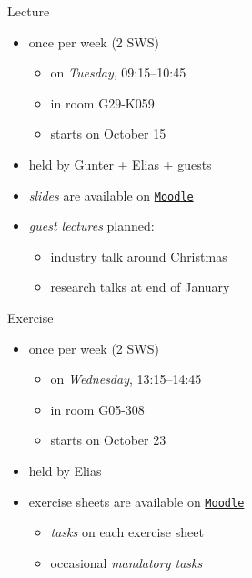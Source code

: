 \begin{frame}{\myframetitle}
	\begin{fancycolumns}
		\begin{definition}{Lecture}
			\begin{itemize}
				\item once per week (2 SWS)
				\begin{itemize}
					\item on \emph{Tuesday}, 09:15--10:45
					\item in room G29-K059
					\item starts on October 15
				\end{itemize}
				\item held by Gunter + Elias + guests
				\item \emph{slides} are available on \texttt{\href{https://elearning.ovgu.de/course/view.php?id=17250}{Moodle}}
				\item \emph{guest lectures} planned:
				\begin{itemize}
					\item industry talk around Christmas
					\item research talks at end of January
				\end{itemize}
			\end{itemize}
		\end{definition}
	\nextcolumn
		\begin{example}{Exercise}
			\begin{itemize}
				\item once per week (2 SWS)
				\begin{itemize}
					\item on \emph{Wednesday}, 13:15--14:45
					\item in room G05-308
					\item starts on October 23
				\end{itemize}
				\item held by Elias
				\item exercise sheets are available on \texttt{\href{https://elearning.ovgu.de/course/view.php?id=17250}{Moodle}}
				\begin{itemize}
					\item \emph{tasks} on each exercise sheet
					\item occasional \emph{mandatory tasks}
				\end{itemize}
			\end{itemize}
		\end{example}
	\end{fancycolumns}
\end{frame}

